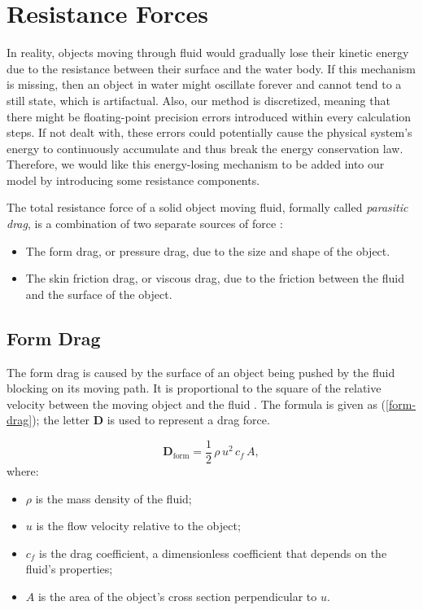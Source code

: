 \section{Resistance Forces}

In reality, objects moving through fluid would gradually lose their kinetic energy due to the resistance between their surface and the water body.
If this mechanism is missing, then an object in water might oscillate forever and cannot tend to a still state, which is artifactual.
Also, our method is discretized, meaning that there might be floating-point precision errors introduced within every calculation steps.
If not dealt with, these errors could potentially cause the physical system's energy to continuously accumulate and thus break the energy conservation law.
Therefore, we would like this energy-losing mechanism to be added into our model by introducing some resistance components.

The total resistance force of a solid object moving fluid, formally called \emph{parasitic drag}, is a combination of two separate sources of force \cite{wadell1934coefficient}:
\begin{itemize}
	\item The form drag, or pressure drag, due to the size and shape of the object.
	\item The skin friction drag, or viscous drag, due to the friction between the fluid and the surface of the object.
\end{itemize}

\subsection{Form Drag}

The form drag is caused by the surface of an object being pushed by the fluid blocking on its moving path.
It is proportional to the square of the relative velocity between the moving object and the fluid \cite{flemmer1986drag}.
The formula is given as (\ref{form-drag}); the letter $\mathbf{D}$ is used to represent a drag force.

\begin{equation}
	\mathbf{D}_{\text{form}}=\frac{1}{2}\,\rho\,u^2\,c_f\,A,
	\label{form-drag}
\end{equation}
where:
\begin{itemize}
	\item $\rho$ is the mass density of the fluid;
	\item $u$ is the flow velocity relative to the object;
	\item $c_f$ is the drag coefficient, a dimensionless coefficient that depends on the fluid's properties;
	\item $A$ is the area of the object's cross section perpendicular to $u$.
\end{itemize}

